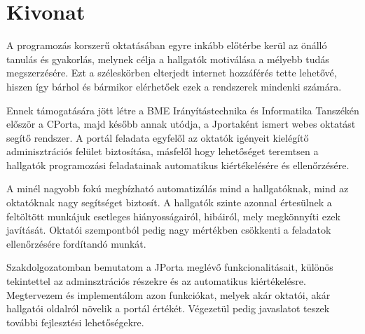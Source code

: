 \chapter*{Kivonat}%
A programozás korszerű oktatásában egyre inkább előtérbe kerül az önálló tanulás és gyakorlás, melynek célja a hallgatók motiválása a mélyebb tudás megszerzésére. Ezt a széleskörben elterjedt internet hozzáférés tette lehetővé, hiszen így bárhol és bármikor elérhetőek ezek a rendszerek mindenki számára.

Ennek támogatására jött létre a BME Irányítástechnika és Informatika Tanszékén először a CPorta, majd később annak utódja, a Jportaként ismert webes oktatást segítő rendszer. A portál feladata egyfelől az oktatók igényeit kielégítő adminisztrációs felület biztosítása, másfelől hogy lehetőséget teremtsen a hallgatók programozási feladatainak automatikus kiértékelésére és ellenőrzésére.

A minél nagyobb fokú megbízható automatizálás mind a hallgatóknak, mind az oktatóknak nagy segítséget biztosít. A hallgatók szinte azonnal értesülnek a feltöltött munkájuk esetleges hiányosságairól, hibáiról, mely megkönnyíti ezek javítását. Oktatói szempontból pedig nagy mértékben csökkenti a feladatok ellenőrzésére fordítandó munkát.

Szakdolgozatomban bemutatom a JPorta meglévő funkcionalitásait, különös tekintettel az adminsztrációs részekre és az automatikus kiértékelésre. Megtervezem és implementálom azon funkciókat, melyek akár oktatói, akár hallgatói oldalról növelik a portál értékét. Végezetül pedig javaslatot teszek további fejlesztési lehetőségekre.

\vfill

